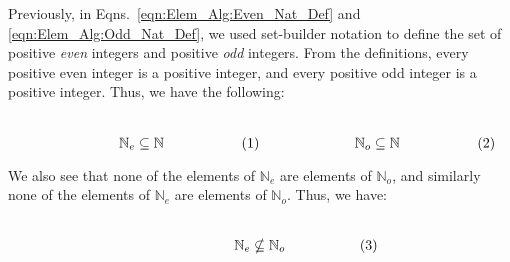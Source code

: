 \documentclass[crop=false,class=book,oneside]{standalone}
\begin{document}
            \begin{lexample}
                Previously, in Eqns.~\ref{eqn:Elem_Alg:Even_Nat_Def}
                and \ref{eqn:Elem_Alg:Odd_Nat_Def}, we used
                set-builder notation to define the set of positive
                \textit{even} integers and positive \textit{odd}
                integers. From the definitions, every positive
                even integer is a positive integer, and every
                positive odd integer is a positive integer.
                Thus, we have the following:
                \par
                \begin{subequations}
                    \begin{minipage}{0.49\textwidth}
                        \centering
                        \begin{equation}
                            \mathbb{N}_{e}\subseteq\mathbb{N}
                        \end{equation}
                    \end{minipage}
                    \hfill
                    \begin{minipage}{0.49\textwidth}
                        \centering
                        \begin{equation}
                            \mathbb{N}_{o}\subseteq\mathbb{N}
                        \end{equation}
                    \end{minipage}
                \end{subequations}
                \par\vspace{2.5ex}
                We also see that none of the elements of
                $\mathbb{N}_{e}$ are elements of $\mathbb{N}_{o}$,
                and similarly none of the elements of
                $\mathbb{N}_{e}$ are elements of $\mathbb{N}_{o}$.
                Thus, we have:
                \par
                \begin{subequations}
                    \begin{minipage}{0.49\textwidth}
                        \centering
                        \begin{equation}
                            \mathbb{N}_{e}\nsubseteq\mathbb{N}_{o}
                        \end{equation}
                    \end{minipage}

\end{subequations}
\end{lexample}
\end{document}
